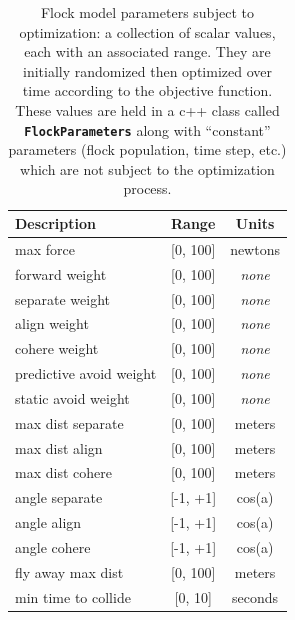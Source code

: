 \documentclass[letterpaper]{article}
\newcommand{\code}[1]{\textbf{\small \texttt{#1}}}
\begin{document}



\begin{table}[]
\centering
\begin{tabular}{ | l | c | c | }
    \hline
    \textbf{Description} & \textbf{Range} & \textbf{Units} \\
    \hline
    max force & [0, 100] & newtons \\
    forward weight & [0, 100] & \textit{none} \\
    separate weight & [0, 100] & \textit{none} \\
    align weight & [0, 100] & \textit{none} \\
    cohere weight & [0, 100] & \textit{none} \\
    predictive avoid weight & [0, 100] & \textit{none} \\
    static avoid weight & [0, 100] & \textit{none} \\
    max dist separate & [0, 100] & meters \\
    max dist align & [0, 100] & meters \\
    max dist cohere & [0, 100] & meters \\
    angle separate & [-1, +1] & cos(a) \\
    angle align & [-1, +1] & cos(a) \\
    angle cohere & [-1, +1] & cos(a) \\
    fly away max dist & [0, 100] & meters \\
    min time to collide & [0, 10] & seconds \\
    \hline
\end{tabular}
\caption{Flock model parameters subject to optimization: a collection of scalar values, each with an associated range. They are initially randomized then optimized over time according to the objective function. These values are held in a c++ class called \code{FlockParameters} along with ``constant'' parameters (flock population, time step, etc.) which are not subject to the optimization process.}
\label{table:flock-parameters}
\end{table}
\end{document}
